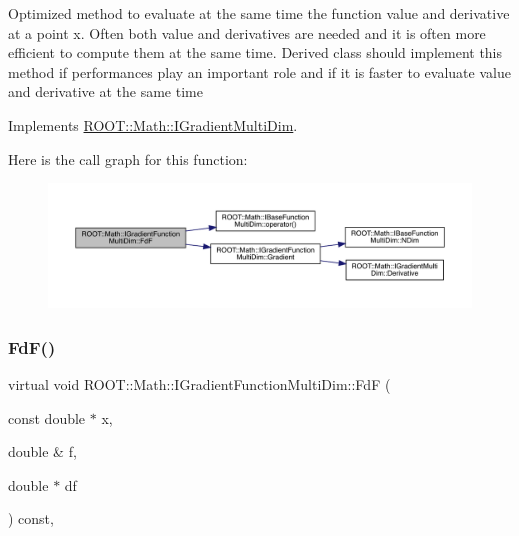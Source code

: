 Optimized method to evaluate at the same time the function value and derivative at a point x. Often both value and derivatives are needed and it is often more efficient to compute them at the same time. Derived class should implement this method if performances play an important role and if it is faster to evaluate value and derivative at the same time 

Implements \mbox{\hyperlink{classROOT_1_1Math_1_1IGradientMultiDim_ad8d0e31b786327014524483a708d8f82}{R\+O\+O\+T\+::\+Math\+::\+I\+Gradient\+Multi\+Dim}}.

Here is the call graph for this function\+:
\nopagebreak
\begin{figure}[H]
\begin{center}
\leavevmode
\includegraphics[width=350pt]{da/d1a/classROOT_1_1Math_1_1IGradientFunctionMultiDim_a58cefd2806ec7b9d389911800ed60386_cgraph}
\end{center}
\end{figure}
\mbox{\label{classROOT_1_1Math_1_1IGradientFunctionMultiDim_a58cefd2806ec7b9d389911800ed60386}} 
\subsubsection{\texorpdfstring{FdF()}{FdF()}\hspace{0.1cm}{\footnotesize\ttfamily [2/3]}}
{\footnotesize\ttfamily virtual void R\+O\+O\+T\+::\+Math\+::\+I\+Gradient\+Function\+Multi\+Dim\+::\+FdF (\begin{DoxyParamCaption}\item[{const double $\ast$}]{x,  }\item[{double \&}]{f,  }\item[{double $\ast$}]{df }\end{DoxyParamCaption}) const\hspace{0.3cm}{\ttfamily [inline]}, {\ttfamily [virtual]}}

